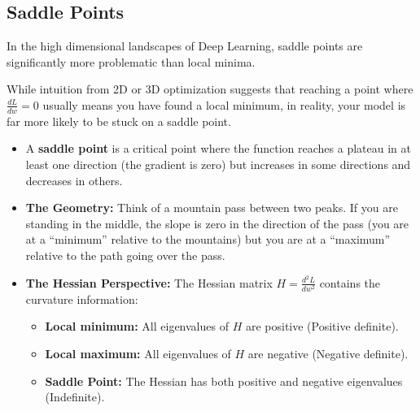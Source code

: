 \subsection{Saddle Points}

In the high dimensional landscapes of Deep Learning, saddle points are significantly more problematic than local minima.

While intuition from 2D or 3D optimization suggests that reaching a point where $\frac{dL}{dw} = 0$ usually means you have found a local minimum, in reality, your model is far more likely to be stuck on a saddle point.

\begin{itemize}
    \item A \textbf{saddle point} is a critical point where the function reaches a plateau in at least one direction (the gradient is zero) but increases in some directions and decreases in others.
    \item \textbf{The Geometry:} Think of a mountain pass between two peaks. If you are standing in the middle, the slope is zero in the direction of the pass (you are at a ``minimum'' relative to the mountains) but you are at a ``maximum'' relative to the path going over the pass.
    \item \textbf{The Hessian Perspective:} The Hessian matrix $H = \frac{d^2 L}{d w^2}$ contains the curvature information:
    \begin{itemize}
        \item \textbf{Local minimum:} All eigenvalues of $H$ are positive (Positive definite).
        \item \textbf{Local maximum:} All eigenvalues of $H$ are negative (Negative definite).
        \item \textbf{Saddle Point:} The Hessian has both positive and negative eigenvalues (Indefinite).
    \end{itemize}
\end{itemize}

